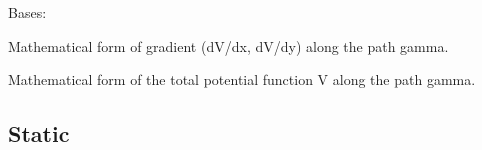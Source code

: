\documentclass[letterpaper,10pt,english]{sphinxmanual}
\begin{document}
\begin{fulllineitems}
\label{\detokenize{string_method:string_method.PotentialPathAnalyt}}
\pysigstartsignatures
{}
\pysigstopsignatures
\sphinxAtStartPar
Bases: 

\begin{fulllineitems}
\label{\detokenize{string_method:string_method.PotentialPathAnalyt.grad}}
\pysigstartsignatures
{}
\pysigstopsignatures
\sphinxAtStartPar
Mathematical form of gradient (dV/dx, dV/dy) along the path gamma.

\end{fulllineitems}


\begin{fulllineitems}
\label{\detokenize{string_method:string_method.PotentialPathAnalyt.total}}
\pysigstartsignatures
{}
\pysigstopsignatures
\sphinxAtStartPar
Mathematical form of the total potential function V along the
path gamma.

\end{fulllineitems}


\begin{fulllineitems}
\label{\detokenize{string_method:string_method.PotentialPathAnalyt.update}}
\pysigstartsignatures
{}
\pysigstopsignatures
\end{fulllineitems}


\end{fulllineitems}



\subsection{Static}
\label{\detokenize{modules:static}}
\sphinxstepscope
\end{document}
